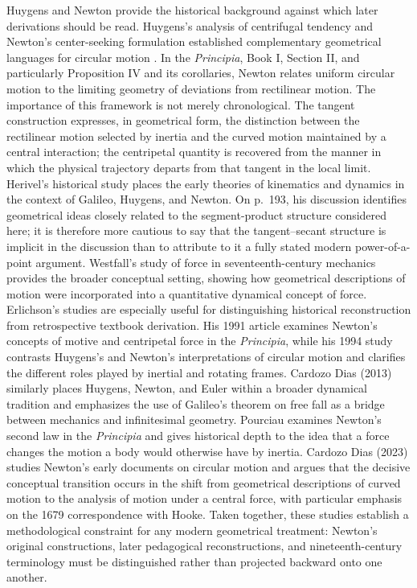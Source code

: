 \documentclass[preprint,12pt,3p,nopreprintline]{elsarticle}
\numberwithin{equation}{section}
\theoremstyle{remark}
\begin{document}
Huygens and Newton provide the historical background against which later derivations should be read. Huygens's analysis of centrifugal tendency and Newton's center-seeking formulation established complementary geometrical languages for circular motion \cite{huygens1888devi,yoder2013catalogue,newton1729principia}. In the \textit{Principia}, Book I, Section II, and particularly Proposition IV and its corollaries, Newton relates uniform circular motion to the limiting geometry of deviations from rectilinear motion. The importance of this framework is not merely chronological. The tangent construction expresses, in geometrical form, the distinction between the rectilinear motion selected by inertia and the curved motion maintained by a central interaction; the centripetal quantity is recovered from the manner in which the physical trajectory departs from that tangent in the local limit. Herivel's historical study \cite{herivel1965background} places the early theories of kinematics and dynamics in the context of Galileo, Huygens, and Newton. On p.~193, his discussion identifies geometrical ideas closely related to the segment-product structure considered here; it is therefore more cautious to say that the tangent--secant structure is implicit in the discussion than to attribute to it a fully stated modern power-of-a-point argument. Westfall's study of force in seventeenth-century mechanics \cite{westfall1971force} provides the broader conceptual setting, showing how geometrical descriptions of motion were incorporated into a quantitative dynamical concept of force. Erlichson's studies are especially useful for distinguishing historical reconstruction from retrospective textbook derivation. His 1991 article \cite{erlichson1991motive} examines Newton's concepts of motive and centripetal force in the \textit{Principia}, while his 1994 study \cite{erlichson1994huygens} contrasts Huygens's and Newton's interpretations of circular motion and clarifies the different roles played by inertial and rotating frames. Cardozo Dias (2013) \cite{dias2013dinamica} similarly places Huygens, Newton, and Euler within a broader dynamical tradition and emphasizes the use of Galileo's theorem on free fall as a bridge between mechanics and infinitesimal geometry. Pourciau \cite{pourciau2019principia} examines Newton's second law in the \textit{Principia} and gives historical depth to the idea that a force changes the motion a body would otherwise have by inertia. Cardozo Dias (2023) \cite{dias2023newton} studies Newton's early documents on circular motion and argues that the decisive conceptual transition occurs in the shift from geometrical descriptions of curved motion to the analysis of motion under a central force, with particular emphasis on the 1679 correspondence with Hooke. Taken together, these studies establish a methodological constraint for any modern geometrical treatment: Newton's original constructions, later pedagogical reconstructions, and nineteenth-century terminology must be distinguished rather than projected backward onto one another.
\end{document}
